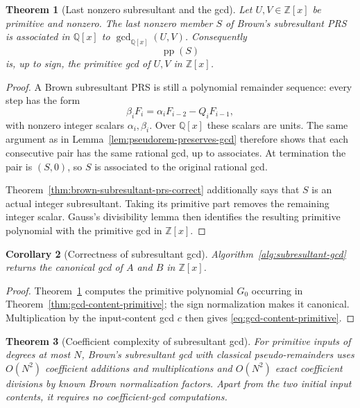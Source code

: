 \documentclass[11pt]{book}
\newtheorem{theorem}{Theorem}[section]
\newtheorem{corollary}[theorem]{Corollary}
\theoremstyle{definition}
\newcommand{\ZZ}{\mathbb Z}
\begin{document}
\begin{theorem}[Last nonzero subresultant and the gcd]
\label{thm:last-subresultant-gcd}
Let $U,V\in\ZZ[x]$ be primitive and nonzero.  The last nonzero member $S$ of
Brown's subresultant PRS is associated in $\mathbb Q[x]$ to
$\gcd_{\mathbb Q[x]}(U,V)$.  Consequently
\[
 \operatorname{pp}(S)
\]
is, up to sign, the primitive gcd of $U,V$ in $\ZZ[x]$.
\end{theorem}

\begin{proof}
A Brown subresultant PRS is still a polynomial remainder sequence: every step
has the form
\[
 \beta_iF_i=\alpha_iF_{i-2}-Q_iF_{i-1},
\]
with nonzero integer scalars $\alpha_i,\beta_i$.  Over $\mathbb Q[x]$ these
scalars are units.  The same argument as in
Lemma~\ref{lem:pseudorem-preserves-gcd} therefore shows that each consecutive
pair has the same rational gcd, up to associates.  At termination the pair is
$(S,0)$, so $S$ is associated to the original rational gcd.

Theorem~\ref{thm:brown-subresultant-prs-correct} additionally says that $S$ is
an actual integer subresultant.  Taking its primitive part removes the remaining
integer scalar.  Gauss's divisibility lemma then identifies the resulting
primitive polynomial with the primitive gcd in $\ZZ[x]$.
\end{proof}

\begin{corollary}[Correctness of subresultant gcd]
\label{cor:subresultant-gcd-correct}
Algorithm~\ref{alg:subresultant-gcd} returns the canonical gcd of $A$ and $B$
in $\ZZ[x]$.
\end{corollary}

\begin{proof}
Theorem~\ref{thm:last-subresultant-gcd} computes the primitive polynomial
$G_0$ occurring in Theorem~\ref{thm:gcd-content-primitive}; the sign
normalization makes it canonical.  Multiplication by the input-content gcd $c$
then gives \eqref{eq:gcd-content-primitive}.
\end{proof}

\begin{theorem}[Coefficient complexity of subresultant gcd]
\label{thm:subresultant-gcd-coefficient-complexity}
For primitive inputs of degrees at most $N$, Brown's subresultant gcd with
classical pseudo-remainders uses $O(N^2)$ coefficient additions and
multiplications and $O(N^2)$ exact coefficient divisions by known Brown
normalization factors.  Apart from the two initial input contents, it requires
no coefficient-gcd computations.
\end{theorem}
\end{document}
